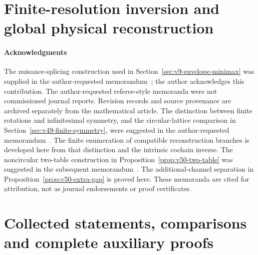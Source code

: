 \part{Finite-resolution inversion and global physical reconstruction}











\subsection*{Acknowledgments}
The nuisance-splicing construction used in
Section~\ref{sec:v9-envelope-minimax} was supplied in the
author-requested memorandum~\cite{A2ReviewV8}; the author acknowledges
this contribution.  The author-requested referee-style memoranda were
not commissioned journal reports.  Revision records and source
provenance are archived separately from the mathematical article.
The distinction between finite rotations and infinitesimal symmetry, and
the circular-lattice comparison in Section~\ref{sec:v49-finite-symmetry},
were suggested in the author-requested memorandum~\cite{A2ReviewV48}.
The finite enumeration of compatible reconstruction branches is developed
here from that distinction and the intrinsic cochain inverse.
The noncircular two-table construction in
Proposition~\ref{prop:v50-two-table} was suggested in the subsequent
memorandum~\cite{A2ReviewV49}.  The additional-channel separation in
Proposition~\ref{prop:v50-extra-gap} is proved here.  These memoranda
are cited for attribution, not as journal endorsements or proof
certificates.

\appendix
\renewcommand{\thesection}{A.\arabic{section}}
\renewcommand{\theHsection}{appendix.\arabic{section}}
\part{Collected statements, comparisons and complete auxiliary proofs}










